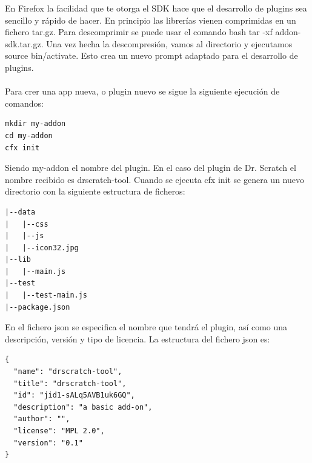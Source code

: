 \documentclass[a4paper, 12pt]{book}
\begin{document}
En Firefox la facilidad que te otorga el SDK hace que el desarrollo de plugins sea 
sencillo y rápido de hacer. En principio las librerías vienen comprimidas en un
fichero tar.gz. Para descomprimir se puede usar el comando bash tar -xf addon-sdk.tar.gz.
Una vez hecha la descompresión, vamos al directorio y ejecutamos source bin/activate.
Esto crea un nuevo prompt adaptado para el desarrollo de plugins.\\ \\

Para crer una app nueva, o plugin nuevo se sigue la siguiente ejecución de comandos:
\begingroup
\fontsize{8pt}{9pt}\selectfont
\begin{verbatim}
mkdir my-addon
cd my-addon
cfx init
\end{verbatim}
\endgroup

Siendo my-addon el nombre del plugin. En el caso del plugin de Dr. Scratch el nombre
recibido es drscratch-tool. Cuando se ejecuta cfx init se genera un nuevo directorio
con la siguiente estructura de ficheros:
\begingroup
\fontsize{8pt}{9pt}\selectfont
\begin{verbatim}
|--data
|   |--css
|   |--js
|   |--icon32.jpg
|--lib
|   |--main.js
|--test
|   |--test-main.js
|--package.json
\end{verbatim}
\endgroup

En el fichero json se especifica el nombre que tendrá el plugin, así como una 
descripción, versión y tipo de licencia. La estructura del fichero json es: \\

\begingroup
\fontsize{8pt}{9pt}\selectfont
\begin{verbatim}
{
  "name": "drscratch-tool",
  "title": "drscratch-tool",
  "id": "jid1-sALq5AVB1uk6GQ",
  "description": "a basic add-on",
  "author": "",
  "license": "MPL 2.0",
  "version": "0.1"
}
\end{verbatim}
\endgroup
\end{document}
